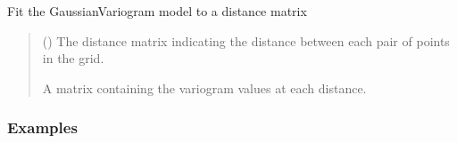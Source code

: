 \documentclass[letterpaper,10pt,english]{sphinxmanual}
\begin{document}
\begin{fulllineitems}
\begin{quote}
\begin{description}
\begin{itemize}
\end{itemize}

\end{description}\end{quote}

\begin{fulllineitems}
\label{\detokenize{covariance:glomar_gridding.variogram.GaussianVariogram.fit}}
\pysigstartsignatures
\pysiglinewithargsret
{}
{}
{}
\pysigstopsignatures
\sphinxAtStartPar
Fit the GaussianVariogram model to a distance matrix
\begin{quote}\begin{description}
\sphinxAtStartPar
{} () \textendash{} The distance matrix indicating the distance between each pair of
points in the grid.

\sphinxAtStartPar
A matrix containing the variogram values at each distance.

\sphinxAtStartPar
{}

\end{description}\end{quote}
\subsubsection*{Examples}

\begin{sphinxVerbatim}[commandchars=\\\{\}]
  
\end{sphinxVerbatim}

\end{fulllineitems}


\end{fulllineitems}
\end{document}
